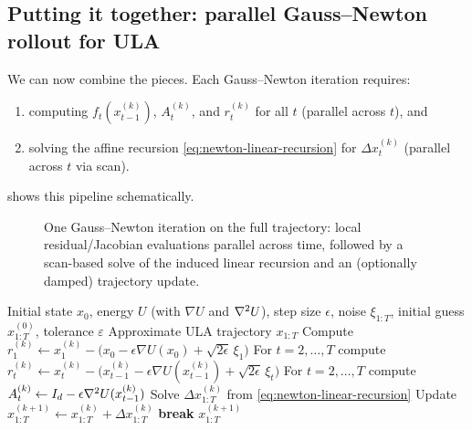\documentclass[11pt]{article}
\begin{document}
\subsection{Putting it together: parallel Gauss--Newton rollout for ULA}
\label{subsec:algorithm}

We can now combine the pieces.
Each Gauss--Newton iteration requires:
\begin{enumerate}[leftmargin=*]
  \item computing $f_t(x_{t-1}^{(k)})$, $A_t^{(k)}$, and $r_t^{(k)}$ for all $t$ (parallel across $t$), and
  \item solving the affine recursion \eqref{eq:newton-linear-recursion} for $\Delta x_t^{(k)}$ (parallel across $t$ via scan).
\end{enumerate}
   shows this pipeline schematically.

\begin{figure}[t]
  \centering
  \resizebox{\linewidth}{!}{}
  \caption{One Gauss--Newton iteration on the full trajectory: local residual/Jacobian evaluations parallel across time, followed by a scan-based solve of the induced linear recursion and an (optionally damped) trajectory update.}
  \label{fig:parallel-mcmc-newton-pipeline}
\end{figure}

\begin{algorithm}[H]
  \caption{Parallel-in-time Gauss--Newton rollout for ULA with fixed noise}
  \label{alg:parallel-mcmc-newton}
  \begin{algorithmic}[1]
    \Require Initial state $x_0$, energy $U$ (with $\nabla U$ and $\nabla^2 U$), step size $\epsilon$, noise $\xi_{1:T}$, initial guess $x_{1:T}^{(0)}$, tolerance $\varepsilon$
    \Ensure Approximate ULA trajectory $x_{1:T}$
      \State Compute $r_1^{(k)} \gets x_1^{(k)} - \bigl(x_0-\epsilon\nabla U(x_0)+\sqrt{2\epsilon}\,\xi_1\bigr)$
      \State For $t=2,\dots,T$ compute $r_t^{(k)} \gets x_t^{(k)} - \bigl(x_{t-1}^{(k)}-\epsilon\nabla U(x_{t-1}^{(k)})+\sqrt{2\epsilon}\,\xi_t\bigr)$ 
      \State For $t=2,\dots,T$ compute $A_t^{(k)} \gets I_d-\epsilon \nabla^2 U(x_{t-1}^{(k)})$ 
      \State Solve $\Delta x_{1:T}^{(k)}$ from \eqref{eq:newton-linear-recursion} 
      \State Update $x_{1:T}^{(k+1)} \gets x_{1:T}^{(k)} + \Delta x_{1:T}^{(k)}$ 
        \State \textbf{break}
      \EndIf
    \EndFor
    \State \Return $x_{1:T}^{(k+1)}$
  \end{algorithmic}
\end{algorithm}
\end{document}
